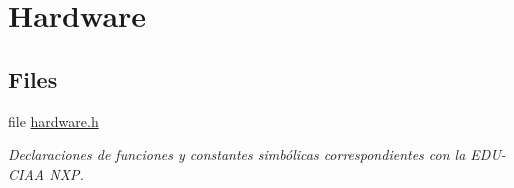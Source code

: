 \hypertarget{group__hardware}{}\section{Hardware}
\label{group__hardware}
\subsection*{Files}
\begin{DoxyCompactItemize}
\item 
file \hyperlink{hardware_8h}{hardware.\+h}
\begin{DoxyCompactList}\small\item\em Declaraciones de funciones y constantes simbólicas correspondientes con la E\+D\+U-\/\+C\+I\+AA N\+XP. \end{DoxyCompactList}\end{DoxyCompactItemize}
